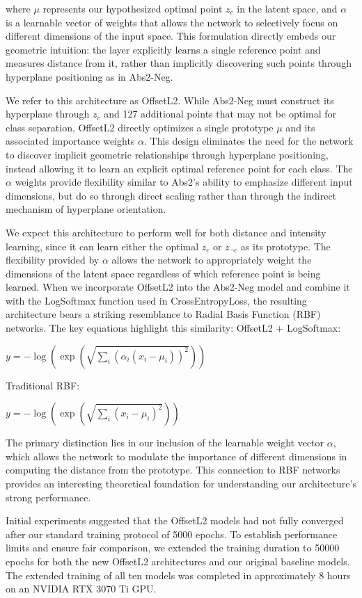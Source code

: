 where $\mu$ represents our hypothesized optimal point $z_c$ in the latent space, and $\alpha$ is a learnable vector of weights that allows the network to selectively focus on different dimensions of the input space. This formulation directly embeds our geometric intuition: the layer explicitly learns a single reference point and measures distance from it, rather than implicitly discovering such points through hyperplane positioning as in Abs2-Neg.

We refer to this architecture as OffsetL2. While Abs2-Neg must construct its hyperplane through $z_c$ and 127 additional points that may not be optimal for class separation, OffsetL2 directly optimizes a single prototype $\mu$ and its associated importance weights $\alpha$. This design eliminates the need for the network to discover implicit geometric relationships through hyperplane positioning, instead allowing it to learn an explicit optimal reference point for each class. The $\alpha$ weights provide flexibility similar to Abs2's ability to emphasize different input dimensions, but do so through direct scaling rather than through the indirect mechanism of hyperplane orientation.

We expect this architecture to perform well for both distance and intensity learning, since it can learn either the optimal $z_c$ or $z_{\neg c}$ as its prototype. The flexibility provided by $\alpha$ allows the network to appropriately weight the dimensions of the latent space regardless of which reference point is being learned.
When we incorporate OffsetL2 into the Abs2-Neg model and combine it with the LogSoftmax function used in CrossEntropyLoss, the resulting architecture bears a striking resemblance to Radial Basis Function (RBF) networks. The key equations highlight this similarity:
OffsetL2 + LogSoftmax:

$y = -\log(\exp(\sqrt{\sum_i (\alpha_i(x_i - \mu_i))^2}))$

Traditional RBF:

$y = -\log(\exp(\sqrt{\sum_i (x_i - \mu_i)^2}))$

The primary distinction lies in our inclusion of the learnable weight vector $\alpha$, which allows the network to modulate the importance of different dimensions in computing the distance from the prototype. This connection to RBF networks provides an interesting theoretical foundation for understanding our architecture's strong performance.

Initial experiments suggested that the OffsetL2 models had not fully converged after our standard training protocol of 5000 epochs. To establish performance limits and ensure fair comparison, we extended the training duration to 50000 epochs for both the new OffsetL2 architectures and our original baseline models. The extended training of all ten models was completed in approximately 8 hours on an NVIDIA RTX 3070 Ti GPU.

